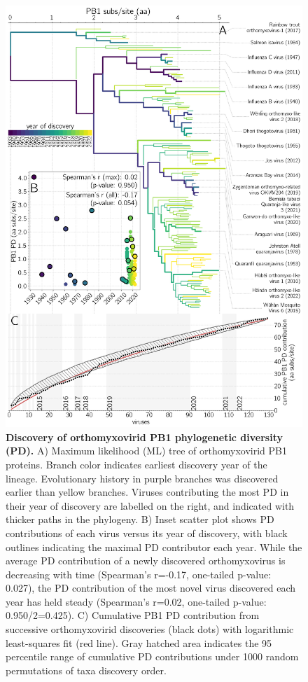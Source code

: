 \documentclass[11pt,twocolumn]{article}
\begin{document}
\begin{figure}%
\centering
\includegraphics[width=0.8\linewidth]{Fig3_contributions.png}
\caption{
\textbf{Discovery of orthomyxovirid PB1 phylogenetic diversity (PD).}
A) Maximum likelihood (ML) tree of orthomyxovirid PB1 proteins.
Branch color indicates earliest discovery year of the lineage. Evolutionary history in purple branches was discovered earlier than yellow branches. Viruses contributing the most PD in their year of discovery are labelled on the right, and indicated with thicker paths in the phylogeny.
B) Inset scatter plot shows PD contributions of each virus versus its year of discovery, with black outlines indicating the maximal PD contributor each year.
While the average PD contribution of a newly discovered orthomyxovirus is decreasing with time (Spearman's r=-0.17, one-tailed p-value: 0.027), the PD contribution of the most novel virus discovered each year has held steady (Spearman's r=0.02, one-tailed p-value: 0.950/2=0.425).
C) Cumulative PB1 PD contribution from successive orthomyxovirid discoveries (black dots) with logarithmic least-squares fit (red line).
Gray hatched area indicates the 95 percentile range of cumulative PD contributions under 1000 random permutations of taxa discovery order.
}
\label{fig:contributions}
\end{figure}
\end{document}
